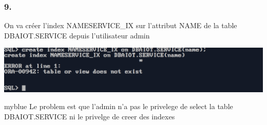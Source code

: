 \subsubsection*{9.}
On va créer l'index NAMESERVICE\_IX sur l’attribut NAME de la table DBAIOT.SERVICE depuis l'utilisateur admin



\begin{center}
    \includegraphics[width=\textwidth]{ScreenShot/Partie4/index.png}
\end{center}

\begin{prettyBox}{}{myblue}
Le problem est que l'admin n'a pas le privelege de select la table DBAIOT.SERVICE ni le privelge de creer des indexes
\end{prettyBox}
